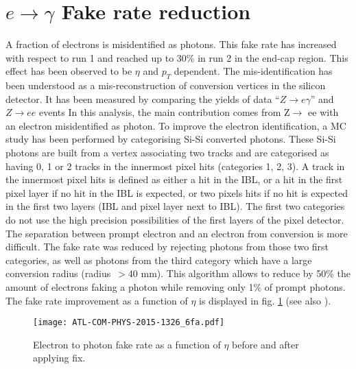 \section{\(e\rightarrow\gamma\) Fake rate reduction}
\label{sec:org846d203}
A fraction of electrons is misidentified as photons.
This fake rate has increased with respect to run 1 and reached up to 30\% in run 2 in the end-cap region.
This effect has been observed to be $\eta$ and $p_T$ dependent.
The mis-identification has been understood as a mis-reconstruction of conversion vertices in the silicon detector.
It has been measured by comparing the yields of data ``$Z\rightarrow e\gamma$'' and \(Z\rightarrow ee\) events
In this analysis, the main contribution comes from Z\(\rightarrow\) ee with an electron misidentified as photon.
To improve the electron identification, a MC study has been performed by categorising Si-Si converted photons.
These Si-Si photons are built from a vertex associating two tracks and are categorised as having 0, 1 or 2 tracks in the innermost pixel hits (categories 1, 2, 3).
A track in the innermost pixel hits is defined as either a hit in the IBL, or a hit in the first pixel layer if no hit in the IBL is expected, or two pixels hits if no hit is expected in the first two layers (IBL and pixel layer next to IBL).
The first two categories do not use the high precision possibilities of the first layers of the pixel detector.
The separation between prompt electron and an electron from conversion is more difficult.
The fake rate was reduced by rejecting photons from those two first categories, as well as photons from the third category which have a large conversion radius (radius~$>40$ mm).
This algorithm allows to reduce by 50\% the amount of electrons faking a photon while removing only 1\% of prompt photons.
The fake rate improvement as a function of $\eta$ is displayed in fig. \ref{fig:orgcd26aee} (see also \cite{ATL-COM-PHYS-2016-575} ).


\begin{figure}[htbp]
\centering
\texttt{[image: ATL-COM-PHYS-2015-1326\_6fa.pdf]}
\caption{\label{fig:orgcd26aee}
Electron to photon fake rate as a function of $\eta$ before and after applying fix.\cite{ATL-COM-PHYS-2015-1326}}
\end{figure}


